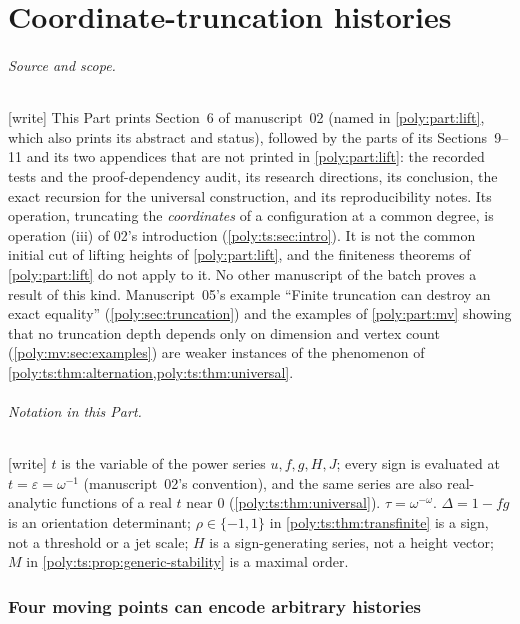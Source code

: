 \documentclass[11pt,a4paper]{article}
\numberwithin{equation}{section}
\theoremstyle{plain}
\newcommand{\wtag}{\textup{[write]}}%
\newcommand{\eps}{\varepsilon}
\begin{document}
\part{Coordinate-truncation histories}\label{poly:part:ts}

\paragraph{Source and scope.} \wtag{} This Part prints Section~6 of
manuscript~02 (named in \cref{poly:part:lift}, which also prints its abstract
and status), followed by the parts of its Sections~9--11 and its two
appendices that are not printed in \cref{poly:part:lift}: the recorded tests
and the proof-dependency audit, its research directions, its conclusion, the
exact recursion for the universal construction, and its reproducibility
notes. Its operation, truncating the \emph{coordinates} of a configuration
at a common degree, is operation (iii) of 02's introduction
(\cref{poly:ts:sec:intro}). It is not the common initial cut of lifting
heights of \cref{poly:part:lift}, and the finiteness theorems of
\cref{poly:part:lift} do not apply to it. No other manuscript of the batch
proves a result of this kind. Manuscript~05's example ``Finite truncation
can destroy an exact equality'' (\cref{poly:sec:truncation}) and the examples
of \cref{poly:part:mv} showing that no truncation depth depends only on
dimension and vertex count (\cref{poly:mv:sec:examples}) are weaker
instances of the phenomenon of \cref{poly:ts:thm:alternation,poly:ts:thm:universal}.

\paragraph{Notation in this Part.} \wtag{} $t$ is the variable of the power
series $u,f,g,H,J$; every sign is evaluated at $t=\eps=\omega^{-1}$
(manuscript~02's convention), and the same series are also real-analytic
functions of a real $t$ near $0$ (\cref{poly:ts:thm:universal}).
$\tau=\omega^{-\omega}$. $\Delta=1-fg$ is an orientation determinant;
$\rho\in\{-1,1\}$ in \cref{poly:ts:thm:transfinite} is a sign, not a
threshold or a jet scale; $H$ is a sign-generating series, not a height
vector; $M$ in \cref{poly:ts:prop:generic-stability} is a maximal order.

\section{Four moving points can encode arbitrary histories}\label{poly:ts:sec:universal}
\end{document}
